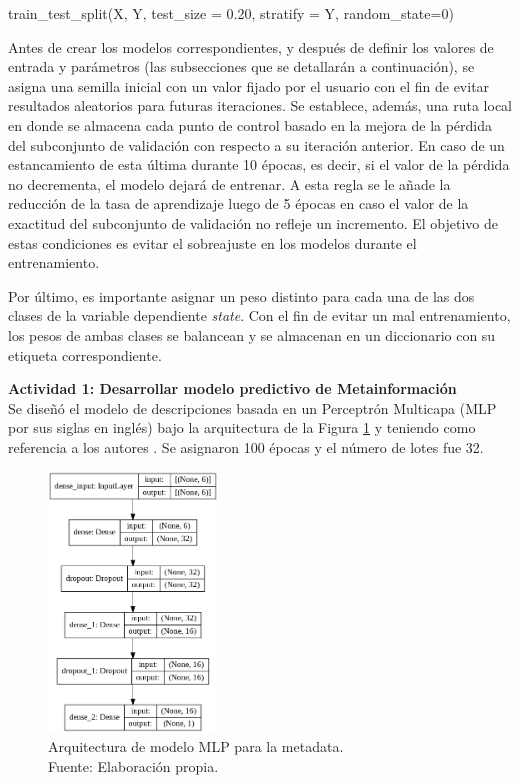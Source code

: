 train\_test\_split(X, Y, test\_size = 0.20, stratify = Y, random\_state=0)

Antes de crear los modelos correspondientes, y después de definir los valores de entrada y parámetros (las subsecciones que se detallarán a continuación), se asigna una semilla inicial con un valor fijado por el usuario con el fin de evitar resultados aleatorios para futuras iteraciones. Se establece, además, una ruta local en donde se almacena cada punto de control basado en la mejora de la pérdida del subconjunto de validación con respecto a su iteración anterior. En caso de un estancamiento de esta última durante 10 épocas, es decir, si el valor de la pérdida no decrementa, el modelo dejará de entrenar. A esta regla se le añade la reducción de la tasa de aprendizaje luego de 5 épocas en caso el valor de la exactitud del subconjunto de validación no refleje un incremento. El objetivo de estas condiciones es evitar el sobreajuste en los modelos durante el entrenamiento.

Por último, es importante asignar un peso distinto para cada una de las dos clases de la variable dependiente \textit{state}. Con el fin de evitar un mal entrenamiento, los pesos de ambas clases se balancean y se almacenan en un diccionario con su etiqueta correspondiente.

\textbf{Actividad 1: Desarrollar modelo predictivo de Metainformación}
\\
Se diseñó el modelo de descripciones basada en un Perceptrón Multicapa (MLP por sus siglas en inglés) bajo la arquitectura de la Figura \ref{4:fig26} y teniendo como referencia a los autores \citeauthor{pr_yu2018deeplearning}. Se asignaron 100 épocas y el número de lotes fue 32.

\begin{figure}[!ht]
	\begin{center}
		\includegraphics[width=0.40\textwidth]{4/figures/model_mlp_metadata.png}
		\caption[Arquitectura de modelo MLP para la metadata]{Arquitectura de modelo MLP para la metadata.\\
			Fuente: Elaboración propia.}
		\label{4:fig26}
	\end{center}
\end{figure}

